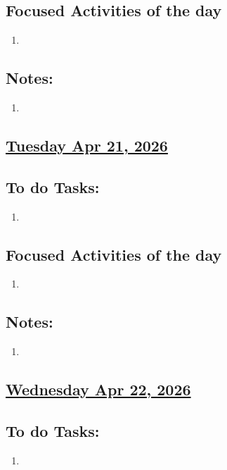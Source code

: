 \subsection*{Focused Activities of the day}
\begin{enumerate}[\ding{212}]  
    \item  
\end{enumerate}
\subsection*{Notes:}
\begin{enumerate}
    \item 
\end{enumerate}
\subsection*{\underline{Tuesday Apr 21, 2026}}
\subsection*{To do Tasks:}
\begin{enumerate}
    \item 
\end{enumerate}
\subsection*{Focused Activities of the day}
\begin{enumerate}[\ding{212}]  
    \item  
\end{enumerate}
\subsection*{Notes:}
\begin{enumerate}
    \item 
\end{enumerate}
\subsection*{\underline{Wednesday Apr 22, 2026} }
\subsection*{To do Tasks:}
\begin{enumerate}
    \item 
\end{enumerate}
